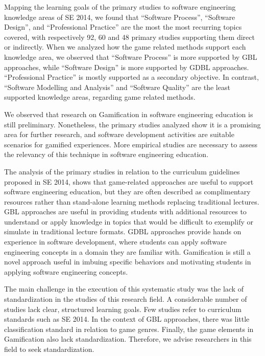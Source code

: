 Mapping the learning goals of the primary studies to software engineering knowledge areas of SE 2014, we found that “Software Process”, “Software Design”, and “Professional Practice” are the most the most recurring topics covered, with respectively 92, 60 and 48 primary studies supporting them direct or indirectly. When we analyzed how the game related methods support each knowledge area, we observed that “Software Process” is more supported by GBL approaches, while “Software Design” is more supported by GDBL approaches. “Professional Practice” is mostly supported as a secondary objective. In contrast, “Software Modelling and Analysis” and “Software Quality” are the least supported knowledge areas, regarding game related methods.

We observed that research on Gamification in software engineering education is still preliminary. Nonetheless, the primary studies analyzed show it is a promising area for further research, and software development activities are suitable scenarios for gamified experiences. More empirical studies are necessary to assess the relevancy of this technique in software engineering education.

The analysis of the primary studies in relation to the curriculum guidelines proposed in SE 2014, shows that game-related approaches are useful to support software engineering education, but they are often described as complimentary resources rather than stand-alone learning methods replacing traditional lectures. GBL approaches are useful in providing students with additional resources to understand or apply knowledge in topics that would be difficult to exemplify or simulate in traditional lecture formats. GDBL approaches provide hands on experience in software development, where students can apply software engineering concepts in a domain they are familiar with. Gamification is still a novel approach useful in imbuing specific behaviors and motivating students in applying software engineering concepts.

The main challenge in the execution of this systematic study was the lack of standardization in the studies of this research field. A considerable number of studies lack clear, structured learning goals. Few studies refer to curriculum standards such as SE 2014. In the context of GBL approaches, there was little classification standard in relation to game genres. Finally, the game elements in Gamification also lack standardization. Therefore, we advise researchers in this field to seek standardization.

